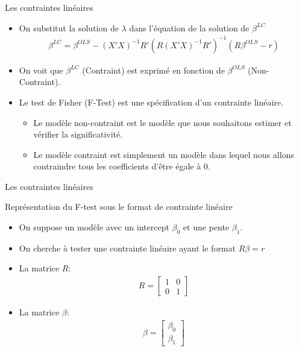 \documentclass{beamer}
\begin{document}
\begin{frame}{Les contraintes linéaires}
\begin{itemize}
\item On substitut la solution de $\lambda$ dans l'équation de la solution de $\beta^{LC}$
\begin{align*}
\beta^{LC}  = \beta^{OLS}-(X'X)^{-1}R'(R(X'X)^{-1}R')^{-1}(R\beta^{OLS}-r)
\end{align*}
\item On voit que $\beta^{LC}$ (Contraint) est exprimé en fonction de $\beta^{OLS}$ (Non-Contraint).
\item Le test de Fisher (F-Test) est une spécification d'un contrainte linéaire.
\begin{itemize}
\item Le modèle non-contraint est le modèle que nous souhaitons estimer et vérifier la significativité.
\item Le modèle contraint est simplement un modèle dans lequel nous allons contraindre tous les coefficients d'être égale à 0.
\end{itemize}
\end{itemize}
\end{frame}

\begin{frame}{Les contraintes linéaires}
\begin{block}{Représentation du F-test sous le format de contrainte linéaire}
\begin{itemize}
\item On suppose un modèle avec un intercept $\beta_0$ et une pente $\beta_1$.
\item On cherche à tester une contrainte linéaire ayant le format $R\beta=r$
\item La matrice $R$:
\begin{align*}
R = \begin{bmatrix}
1 & 0 \\
0 & 1 
\end{bmatrix}
\end{align*}
\item La matrice $\beta$:
\begin{align*}
\beta= \begin{bmatrix}
\beta_0 \\
\beta_1
\end{bmatrix}
\end{align*}
\end{itemize}
\end{block}
\end{frame}
\end{document}
